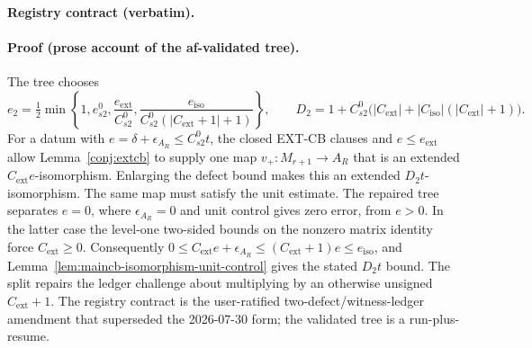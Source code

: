 \noindent\textbf{Registry contract (verbatim).}
\paragraph{Proof (prose account of the af-validated tree).}
The tree chooses
\[
 e_2=\tfrac12\min\!\left\{1,e^0_{s2},\frac{e_{\mathrm{ext}}}{C^0_{s2}},
 \frac{e_{\mathrm{iso}}}{C^0_{s2}(|C_{\mathrm{ext}}+1|+1)}\right\},\qquad
 D_2=1+C^0_{s2}\bigl(|C_{\mathrm{ext}}|+|C_{\mathrm{iso}}|
 (|C_{\mathrm{ext}}|+1)\bigr).
\]
For a datum with $e=\delta+\epsilon_{A_R}\le C^0_{s2}t$, the closed EXT-CB clauses and
$e\le e_{\mathrm{ext}}$ allow Lemma~\ref{conj:extcb} to supply one map
$v_+:M_{r+1}\to A_R$ that is an extended $C_{\mathrm{ext}}e$-isomorphism.  Enlarging
the defect bound makes this an extended $D_2t$-isomorphism.
The same map must satisfy the unit estimate.  The repaired tree separates $e=0$, where
$\epsilon_{A_R}=0$ and unit control gives zero error, from $e>0$.  In the latter case the
level-one two-sided bounds on the nonzero matrix identity force $C_{\mathrm{ext}}\ge0$.
Consequently
$0\le C_{\mathrm{ext}}e+\epsilon_{A_R}\le(C_{\mathrm{ext}}+1)e\le e_{\mathrm{iso}}$,
and Lemma~\ref{lem:maincb-isomorphism-unit-control} gives the stated $D_2t$ bound.
The split repairs the ledger challenge about multiplying by an otherwise unsigned
$C_{\mathrm{ext}}+1$.  The registry contract is the user-ratified two-defect/witness-ledger
amendment that superseded the 2026-07-30 form; the validated tree is a run-plus-resume.
